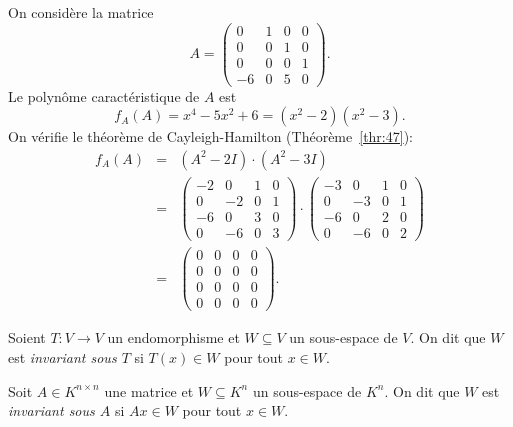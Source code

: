 \begin{example}
  \label{exe:59}
  On considère la matrice
  \begin{displaymath}
    A = \begin{pmatrix}0 & 1 & 0 & 0\\0 & 0 & 1 & 0\\0 & 0 & 0 & 1\\-6 & 0 & 5 & 0\end{pmatrix}. 
  \end{displaymath}
  Le polynôme caractéristique de $A$ est
  \begin{displaymath}
    f_A(A) = x^4 - 5x^2 +6 = (x^2 -2) (x^2-3). 
  \end{displaymath}
  On vérifie le théorème de Cayleigh-Hamilton (Théorème~\ref{thr:47}): 
  \begin{eqnarray*} f_A(A) & = & (A^2 - 2I ) ⋅ (A^2 - 3I ) \\
                           & = & \begin{pmatrix}-2 & 0 & 1 & 0\\0 & -2 & 0 & 1\\-6 & 0 & 3 & 0\\0 & -6 & 0 & 3\end{pmatrix} ⋅ \begin{pmatrix}-3 & 0 & 1 & 0\\0 & -3 & 0 & 1\\-6 & 0 & 2 & 0\\0 & -6 & 0 & 2\end{pmatrix} \\
    & = & \begin{pmatrix}0 & 0 & 0 & 0\\0 & 0 & 0 & 0\\0 & 0 & 0 & 0\\0 & 0 & 0 & 0\end{pmatrix}. 
  \end{eqnarray*}
\end{example}
\begin{definition}
  \label{def:35}
  Soient $T:V \rightarrow V$ un endomorphisme et $W \subseteq V$ un sous-espace de $V$. On dit que $W$ est \emph{invariant sous $T$} si $T(x) \in W$ pour tout $x \in W$.

  \medskip
  \noindent
Soit $A ∈ K^{n×n}$ une matrice et $W \subseteq K^n$ un sous-espace de $K^n$. On dit que $W$ est \emph{invariant sous $A$} si $A x \in W$ pour tout $x \in W$. 
\end{definition}



